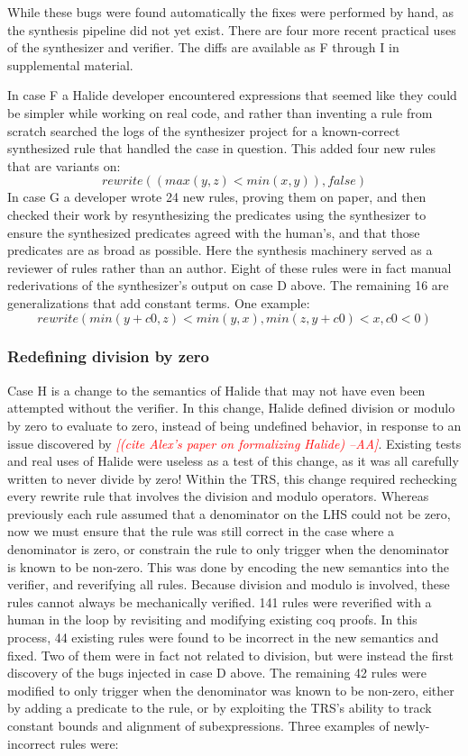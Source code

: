 \documentclass[acmsmall,review,anonymous]{acmart}\settopmatter{printfolios=true,printccs=false,printacmref=false}
\newcommand{\aba}[1]{\textcolor{red}{\textit{[{#1} --AA]}}}
\begin{document}
While these bugs were found automatically the fixes were performed by hand, as the synthesis pipeline did not yet exist. There are four more recent practical uses of the synthesizer and verifier. The diffs are available as F through I in supplemental material. 

In case F a Halide developer encountered expressions that seemed like they could be simpler while working on real code, and rather than inventing a rule from scratch searched the logs of the synthesizer project for a known-correct synthesized rule that handled the case in question. This added four new rules that are variants on:
\[
rewrite((max(y, z) < min(x, y)), false)
\]
In case G a developer wrote 24 new rules, proving them on paper, and then checked their work by resynthesizing the predicates using the synthesizer to ensure the synthesized predicates agreed with the human’s, and that those predicates are as broad as possible. Here the synthesis machinery served as a reviewer of rules rather than an author. Eight of these rules were in fact manual rederivations of the synthesizer’s output on case D above. The remaining 16 are generalizations that add constant terms. One example:
\[
rewrite(min(y + c0, z) < min(y, x), min(z, y + c0) < x, c0 < 0)
\]

\subsubsection{Redefining division by zero}

Case H is a change to the semantics of Halide that may not have even been attempted without the verifier. In this change, Halide defined division or modulo by zero to evaluate to zero, instead of being undefined behavior, in response to an issue discovered by \aba{(cite Alex’s paper on formalizing Halide)}. Existing tests and real uses of Halide were useless as a test of this change, as it was all carefully written to never divide by zero! Within the TRS, this change required rechecking every rewrite rule that involves the division and modulo operators. Whereas previously each rule assumed that a denominator on the LHS could not be zero, now we must ensure that the rule was still correct in the case where a denominator is zero, or constrain the rule to only trigger when the denominator is known to be non-zero. This was done by encoding the new semantics into the verifier, and reverifying all rules. Because division and modulo is involved, these rules cannot always be mechanically verified. 141 rules were reverified with a human in the loop by revisiting and modifying existing coq proofs. In this process, 44 existing rules were found to be incorrect in the new semantics and fixed. Two of them were in fact not related to division, but were instead the first discovery of the bugs injected in case D above. The remaining 42 rules were modified to only trigger when the denominator was known to be non-zero, either by adding a predicate to the rule, or by exploiting the TRS’s ability to track constant bounds and alignment of subexpressions. Three examples of newly-incorrect rules were:
\end{document}
